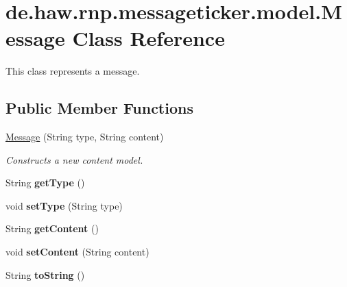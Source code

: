 \hypertarget{classde_1_1haw_1_1rnp_1_1messageticker_1_1model_1_1Message}{\section{de.\-haw.\-rnp.\-messageticker.\-model.\-Message Class Reference}
\label{classde_1_1haw_1_1rnp_1_1messageticker_1_1model_1_1Message}
}


This class represents a message.  


\subsection*{Public Member Functions}
\begin{DoxyCompactItemize}
\item 
\hyperlink{classde_1_1haw_1_1rnp_1_1messageticker_1_1model_1_1Message_ac95495a6f00dbda08ab5ee772886f1bd}{Message} (String type, String content)
\begin{DoxyCompactList}\small\item\em Constructs a new content model. \end{DoxyCompactList}\item 
\hypertarget{classde_1_1haw_1_1rnp_1_1messageticker_1_1model_1_1Message_ac762c97b4f90cb2b4e4f7d35b88ac46b}{String {\bfseries get\-Type} ()}\label{classde_1_1haw_1_1rnp_1_1messageticker_1_1model_1_1Message_ac762c97b4f90cb2b4e4f7d35b88ac46b}

\item 
\hypertarget{classde_1_1haw_1_1rnp_1_1messageticker_1_1model_1_1Message_aa5296edf418ad44a2d064b424dcc9d1a}{void {\bfseries set\-Type} (String type)}\label{classde_1_1haw_1_1rnp_1_1messageticker_1_1model_1_1Message_aa5296edf418ad44a2d064b424dcc9d1a}

\item 
\hypertarget{classde_1_1haw_1_1rnp_1_1messageticker_1_1model_1_1Message_a9601ba408710f1b7d1f3e7b1ac8b9697}{String {\bfseries get\-Content} ()}\label{classde_1_1haw_1_1rnp_1_1messageticker_1_1model_1_1Message_a9601ba408710f1b7d1f3e7b1ac8b9697}

\item 
\hypertarget{classde_1_1haw_1_1rnp_1_1messageticker_1_1model_1_1Message_addf2895714909698f20fd7520c19b4f1}{void {\bfseries set\-Content} (String content)}\label{classde_1_1haw_1_1rnp_1_1messageticker_1_1model_1_1Message_addf2895714909698f20fd7520c19b4f1}

\item 
\hypertarget{classde_1_1haw_1_1rnp_1_1messageticker_1_1model_1_1Message_aa65c5da2412a4fd68c8f852fd1667da1}{String {\bfseries to\-String} ()}\label{classde_1_1haw_1_1rnp_1_1messageticker_1_1model_1_1Message_aa65c5da2412a4fd68c8f852fd1667da1}

\end{DoxyCompactItemize}


